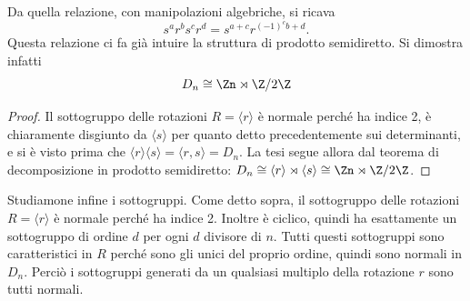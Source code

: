     Da quella relazione, con manipolazioni algebriche, si ricava 
    \[ s^ar^bs^cr^d= s^{a+c} r^{(-1)^cb + d}. \]
    Questa relazione ci fa già intuire la struttura di prodotto semidiretto. Si dimostra infatti
    \[ D_n \cong \Zn \rtimes \Z/2\Z \]
\begin{proof}
    Il sottogruppo delle rotazioni $R=\langle r \rangle$ è normale perché ha indice 2, è chiaramente disgiunto da $\langle s \rangle$ per quanto detto precedentemente sui determinanti, e si è visto prima che $\langle r \rangle \langle s \rangle = \langle r, s \rangle = D_n$. La tesi segue allora dal teorema di decomposizione in prodotto semidiretto: $D_n \cong \langle r \rangle \rtimes \langle s\rangle \cong \Zn \rtimes \Z/2\Z$.
\end{proof}
Studiamone infine i sottogruppi. Come detto sopra, il sottogruppo delle rotazioni $R = \langle r \rangle$ è normale perché ha indice 2. Inoltre è ciclico, quindi ha esattamente un sottogruppo di ordine $d$ per ogni $d$ divisore di $n$. Tutti questi sottogruppi sono caratteristici in $R$ perché sono gli unici del proprio ordine, quindi sono normali in $D_n$. Perciò i sottogruppi generati da un qualsiasi multiplo della rotazione $r$ sono tutti normali.

